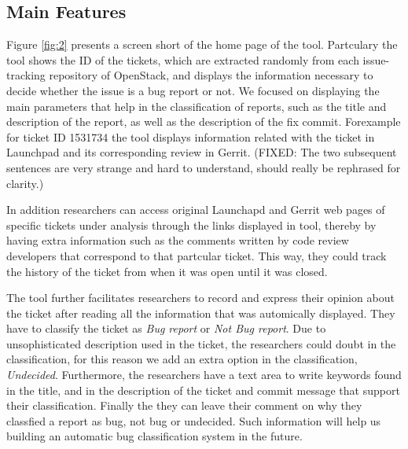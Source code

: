 \documentclass[runningheads,a4paper]{llncs}
\begin{document}
\subsection{Main Features}
\label{sec:2.2}
Figure \ref{fig:2} presents a screen short of the home page of the tool. Partculary the tool shows the ID of the tickets, which are extracted randomly from each issue-tracking repository of OpenStack, and displays the information necessary to decide whether the issue is a bug report or not. We focused on displaying the main parameters that help in the classification of reports, such as the title and description of the report, as well as the description of the fix commit. Forexample for ticket ID 1531734 the tool displays information related with the ticket in Launchpad and its corresponding review in Gerrit.
(FIXED: The two subsequent sentences are very strange and hard to understand, should really be rephrased for clarity.)

In addition researchers can access original Launchapd and Gerrit web pages of specific tickets under analysis through the links displayed in tool, thereby by having extra information such as the comments written by code review developers that correspond to that partcular ticket. This way, they could track the history of the ticket from when it was open until it was closed.


The tool further facilitates researchers to record and express their opinion about the ticket after reading all the information that was automically displayed. They have to classify the ticket as \textit{Bug report} or \textit{Not Bug report}. Due to unsophisticated description used in the ticket, the researchers could doubt in the classification, for this reason we add an extra option in the classification, \textit{Undecided}. Furthermore, the researchers have a text area to write keywords found in the title, and in the description of the ticket and commit message that support their classification.
Finally the they can leave their comment on why they classfied a report as bug, not bug or undecided. Such information will help us building an automatic bug classification system in the future.
\end{document}
